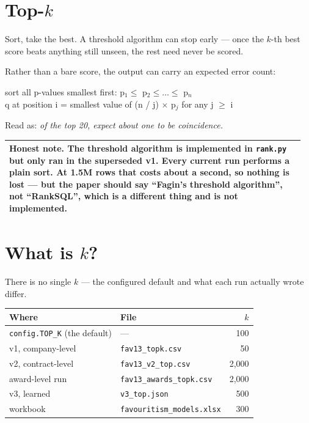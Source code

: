 \documentclass[11pt,a4paper]{article}
\makeatletter
\newenvironment{keybox}{\par\vspace{0.3em}\noindent
  \begin{tabular}{|@{\hspace{9pt}}p{0.955\linewidth}@{\hspace{9pt}}|}\hline
  \rule{0pt}{1.1em}}{\\[0.5em]\hline\end{tabular}\par\vspace{0.3em}}
\makeatother
\begin{document}
\section{Top-$k$}

Sort, take the best. A threshold algorithm can stop early --- once the $k$-th best score
beats anything still unseen, the rest need never be scored.

Rather than a bare score, the output can carry an expected error count:
\begin{center}\ttfamily\small
sort all p-values smallest first: p$_1 \le$ p$_2 \le \dots \le$ p$_n$\\[3pt]
q at position i = smallest value of (n / j) $\times$ p$_j$ for any j $\ge$ i
\end{center}
Read as: \emph{of the top 20, expect about one to be coincidence.}

\begin{keybox}
\textbf{Honest note.} The threshold algorithm is implemented in \texttt{rank.py} but only
ran in the superseded v1. Every current run performs a plain sort. At 1.5M rows that costs
about a second, so nothing is lost --- but the paper should say ``Fagin's threshold
algorithm'', not ``RankSQL'', which is a different thing and is not implemented.
\end{keybox}

\section{What is $k$?}

There is no single $k$ --- the configured default and what each run actually wrote differ.

\begin{center}\small
\begin{tabular}{@{}llr@{}}
\toprule
\textbf{Where} & \textbf{File} & \textbf{$k$} \\
\midrule
\texttt{config.TOP\_K} (the default) & --- & 100 \\
v1, company-level & \texttt{fav13\_topk.csv} & 50 \\
v2, contract-level & \texttt{fav13\_v2\_top.csv} & 2{,}000 \\
award-level run & \texttt{fav13\_awards\_topk.csv} & 2{,}000 \\
v3, learned & \texttt{v3\_top.json} & 500 \\
workbook & \texttt{favouritism\_models.xlsx} & 300 \\
\bottomrule
\end{tabular}
\end{center}
\end{document}
